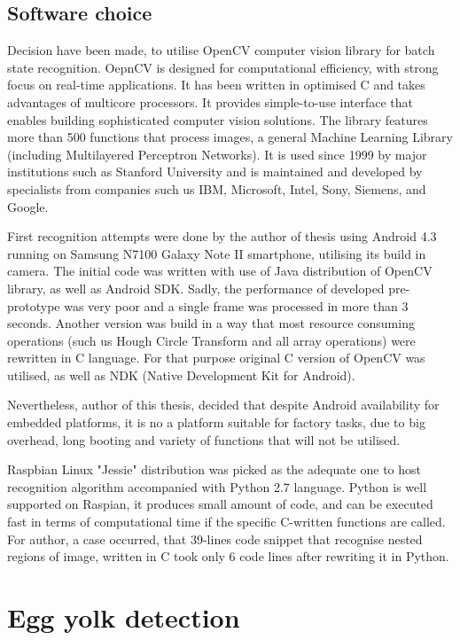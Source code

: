 \documentclass[12pt,twoside,a4paper]{article}
\begin{document}
\newpage

\subsection{Software choice}
Decision have been made, to utilise OpenCV computer vision library for batch state recognition.
OepnCV is designed for computational efficiency, with strong focus on real-time applications.
It has been written in optimised C and takes advantages of multicore processors.
It provides simple-to-use interface that enables building sophisticated computer vision solutions.
The library features more than 500 functions that process images, a general Machine Learning Library (including Multilayered Perceptron Networks).
It is used since 1999 by major institutions such as Stanford University and is maintained and developed by specialists from companies such us IBM, Microsoft, Intel, Sony, Siemens, and Google.\cite{learnopencv}

First recognition attempts were done by the author of thesis using Android 4.3 running on Samsung N7100 Galaxy Note II smartphone, utilising its build in camera.
The initial code was written with use of Java distribution of OpenCV library, as well as Android SDK.
Sadly, the performance of developed pre-prototype was very poor and a single frame was processed in more than 3 seconds.
Another version was build in a way that most resource consuming operations (such us Hough Circle Transform and all array operations) were rewritten in C language.
For that purpose original C version of OpenCV was utilised, as well as NDK (Native Development Kit for Android).

Nevertheless, author of this thesis, decided that despite Android availability for embedded platforms, it is no a platform suitable for factory tasks, due to big overhead, long booting and variety of functions that will not be utilised.

Raspbian Linux "Jessie" distribution was picked as the adequate one to host recognition algorithm accompanied with Python 2.7 language.
Python is well supported on Raspian, it produces small amount of code, and can be executed fast in terms of computational time if the specific C-written functions are called.\cite{performance}
For author, a case occurred, that 39-lines code snippet that recognise nested regions of image, written in C took only 6 code lines after rewriting it in Python.


\section{Egg yolk detection}
\end{document}
